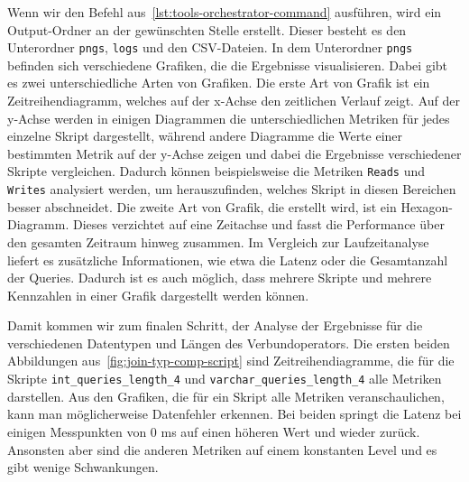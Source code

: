 Wenn wir den Befehl aus~\ref{lst:tools-orchestrator-command} ausführen, wird ein Output-Ordner an der gewünschten Stelle erstellt.
Dieser besteht es den Unterordner \texttt{pngs}, \texttt{logs} und den CSV-Dateien.
In dem Unterordner \texttt{pngs} befinden sich verschiedene Grafiken, die die Ergebnisse visualisieren.
Dabei gibt es zwei unterschiedliche Arten von Grafiken.
Die erste Art von Grafik ist ein Zeitreihendiagramm, welches auf der x-Achse den zeitlichen Verlauf zeigt.
Auf der y-Achse werden in einigen Diagrammen die unterschiedlichen Metriken für jedes einzelne Skript dargestellt, während andere Diagramme die Werte einer bestimmten Metrik auf der y-Achse zeigen und dabei die Ergebnisse verschiedener Skripte vergleichen.
Dadurch können beispielsweise die Metriken \texttt{Reads} und \texttt{Writes} analysiert werden, um herauszufinden, welches Skript in diesen Bereichen besser abschneidet.
Die zweite Art von Grafik, die erstellt wird, ist ein Hexagon-Diagramm.
Dieses verzichtet auf eine Zeitachse und fasst die Performance über den gesamten Zeitraum hinweg zusammen.
Im Vergleich zur Laufzeitanalyse liefert es zusätzliche Informationen, wie etwa die Latenz oder die Gesamtanzahl der Queries.
Dadurch ist es auch möglich, dass mehrere Skripte und mehrere Kennzahlen in einer Grafik dargestellt werden können.

Damit kommen wir zum finalen Schritt, der Analyse der Ergebnisse für die verschiedenen Datentypen und Längen des Verbundoperators.
Die ersten beiden Abbildungen aus~\ref{fig:join-typ-comp-script} sind Zeitreihendiagramme, die für die Skripte \texttt{int\_queries\_length\_4} und \texttt{varchar\_queries\_length\_4} alle Metriken darstellen.
Aus den Grafiken, die für ein Skript alle Metriken veranschaulichen, kann man möglicherweise Datenfehler erkennen.
Bei beiden springt die Latenz bei einigen Messpunkten von 0 ms auf einen höheren Wert und wieder zurück.
Ansonsten aber sind die anderen Metriken auf einem konstanten Level und es gibt wenige Schwankungen.


